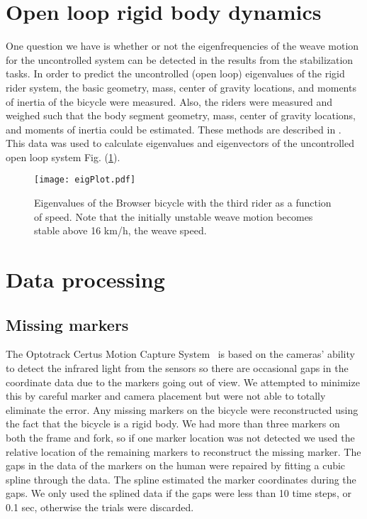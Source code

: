 \section{Open loop rigid body dynamics}
\label{sec:openLoop}
One question we have is whether or not the eigenfrequencies of the weave motion for the uncontrolled system can be detected in the results from the stabilization tasks. In order to predict the uncontrolled (open loop) eigenvalues of the rigid rider system, the basic geometry, mass, center of gravity locations, and moments of inertia of the bicycle were measured. Also, the riders were measured and weighed such that the body segment geometry, mass, center of gravity locations, and moments of inertia could be estimated. These methods are described in \cite{Moore2009a}. This data was used to calculate eigenvalues and eigenvectors of the uncontrolled open loop system Fig. (\ref{fig:eigPlot}).
\begin{figure}[]
    \begin{center}
        \texttt{[image: eigPlot.pdf]}
    \end{center}
    \caption{Eigenvalues of the Browser bicycle with the third rider as a function of speed. Note that the initially unstable weave motion becomes stable above 16 km/h, the weave speed.}
    \label{fig:eigPlot}
\end{figure}

\section{Data processing}
\label{sec:data}

\subsection{Missing markers}
\label{sec:missingMarkers}
The Optotrack Certus Motion Capture System~\cite{NorthernDigitalIncorporated2009} is based on the cameras' ability to detect the infrared light from the sensors so there are occasional gaps in the coordinate data due to the markers going out of view. We attempted to minimize this by careful marker and camera placement but were not able to totally eliminate the error. Any missing markers on the bicycle were reconstructed using the fact that the bicycle is a rigid body. We had more than three markers on both the frame and fork, so if one marker location was not detected we used the relative location of the remaining markers to reconstruct the missing marker. The gaps in the data of the markers on the human were repaired by fitting a cubic spline through the data. The spline estimated the marker coordinates during the gaps. We only used the splined data if the gaps were less than 10 time steps, or 0.1 sec, otherwise the trials were discarded.


